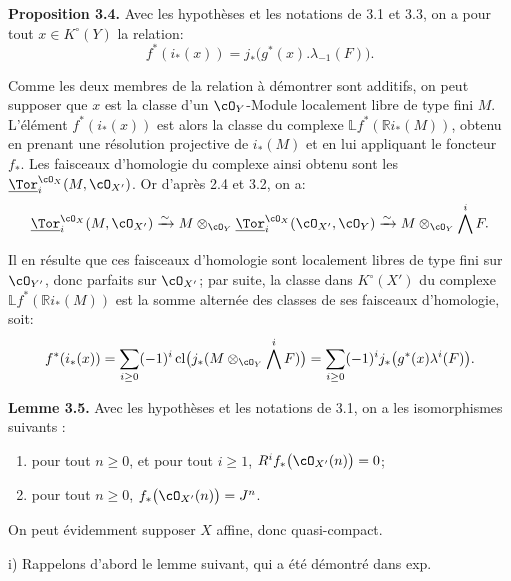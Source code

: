 \textbf{Proposition 3.4.} Avec les hypothèses et les notations de 3.1 et 3.3, on a pour tout \(x\in K^\circ(Y)\) la relation:
\[
f^*(i_*(x))=j_*\bigl(g^*(x).\lambda_{-1}(F)\bigr).
\]

Comme les deux membres de la relation à démontrer sont additifs, on peut supposer que \(x\) est la classe d'un \(\cO_Y\)-Module localement libre de type fini \(M\). L'élément \(f^*(i_*(x))\) est alors la classe du complexe \(\mathbb Lf^*(\mathbb Ri_*(M))\), obtenu en prenant une résolution projective de \(i_*(M)\) et en lui appliquant le foncteur \(f_*\). Les faisceaux d'homologie du complexe ainsi obtenu sont les \(\underline{\Tor}_i^{\cO_X}(M,\cO_{X'})\). Or d'après 2.4 et 3.2, on a:
\[
\underline{\Tor}_i^{\cO_X}(M,\cO_{X'})
\xrightarrow{\sim}
M\otimes_{\cO_Y}\underline{\Tor}_i^{\cO_X}(\cO_{X'},\cO_Y)
\xrightarrow{\sim}
M\otimes_{\cO_Y}\bigwedge^iF.
\]

Il en résulte que ces faisceaux d'homologie sont localement libres de type fini sur \(\cO_{Y'}\), donc parfaits sur \(\cO_{X'}\); par suite, la classe dans \(K^\circ(X')\) du complexe \(\mathbb Lf^*(\mathbb Ri_*(M))\) est la somme alternée des classes de ses faisceaux d'homologie, soit:
\[
f^*(i_*(x))
=\sum_{i\ge0}(-1)^i\operatorname{cl}
\bigl(j_*(M\otimes_{\cO_Y}\bigwedge^iF)\bigr)
=\sum_{i\ge0}(-1)^i
j_*\bigl(g^*(x)\lambda^i(F)\bigr).
\]

\textbf{Lemme 3.5.} Avec les hypothèses et les notations de 3.1, on a les isomorphismes suivants :
\begin{enumerate}[label=\roman*)]
\item pour tout \(n\ge0\), et pour tout \(i\ge1\), \(R^if_*\bigl(\cO_{X'}(n)\bigr)=0\);
\item pour tout \(n\ge0\), \(f_*\bigl(\cO_{X'}(n)\bigr)=J^n\).
\end{enumerate}

On peut évidemment supposer \(X\) affine, donc quasi-compact.

i) Rappelons d'abord le lemme suivant, qui a été démontré dans exp.

